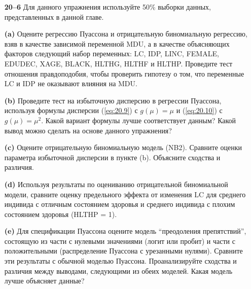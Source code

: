 \begin{itemize}
    \item[\textbf{20--6}]
Для данного упражнения используйте 50\% выборки данных, представленных в данной главе.
        \item[\textbf{(a)}]
Оцените регрессию Пуассона и отрицательную биномиальную регрессию, взяв в качестве зависимой переменной MDU, а в качестве объясняющих факторов следующий набор переменных: LC, IDP, LINC, FEMALE, EDUDEC, XAGE, BLACK, HLTHG, HLTHF и HLTHP. Проведите тест отношения правдоподобия, чтобы проверить гипотезу о том, что переменные LC и IDP не оказывают влияния на MDU.
        \item[\textbf{(b)}]
Проведите тест на избыточную дисперсию в регрессии Пуассона, используя формулы дисперсии (\ref{eq:20.9}) с $g(\mu) = \mu$ и (\ref{eq:20.10}) с $g(\mu) = \mu^2$. %
Какой вариант формулы лучше соответствует данным? Какой вывод можно сделать на основе данного упражнения?
        \item[\textbf{(c)}]
Оцените отрицательную биномиальную модель (NB2). Сравните оценки параметра избыточной дисперсии в пункте (b). Объясните сходства и различия.
        \item[\textbf{(d)}]
Используя результаты по оцениванию отрицательной биномиальной модели, сравните оценку предельного эффекта от изменения LC для среднего индивида с отличным состоянием здоровья и среднего индивида с плохим состоянием здоровья (HLTHP = 1).
        \item[\textbf{(e)}]
Для спецификации Пуассона оцените модель ``преодоления препятствий'', состоящую из части с нулевыми значениями (логит или пробит) и части с положительными (распределение Пуассона с урезанными нулями). Сравните эти результаты с обычной моделью Пуассона. Проанализируйте сходства и различия между выводами, следующими из обеих моделей. Какая модель лучше объясняет данные?
\end{itemize}


